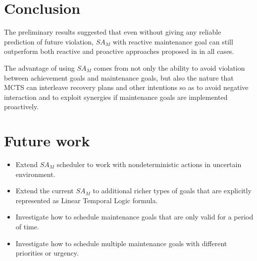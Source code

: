 \documentclass[a0, portrait]{a0poster}
\newcommand{\SAM}{\emph{$SA_M$}\xspace}
\begin{document}
\begin{multicols}{3}

\color{SaddleBrown} %


\color{DarkSlateGray} %


\section*{Conclusion}
The preliminary results suggested that even without giving any reliable prediction of future violation, \SAM with reactive maintenance goal can still outperform both reactive and proactive approaches proposed in \cite{DuffHT06} in all cases.

The advantage of using \SAM comes from not only the ability to avoid violation between achievement goals and maintenance goals, but also the nature that MCTS can interleave recovery plans and other intentions so as to avoid negative interaction and to exploit synergies 
if maintenance goals are implemented proactively.

\section*{Future work}
\begin{itemize}
    \item Extend \SAM scheduler to work with nondeterministic actions in uncertain environment.
    \item Extend the current \SAM to additional richer types of goals that are explicitly represented as Linear Temporal Logic formula.
    \item Investigate how to schedule maintenance goals that are only valid for a period of time.
    \item Investigate how to schedule multiple maintenance goals with different priorities or urgency.
\end{itemize}


\end{multicols}
\end{document}
